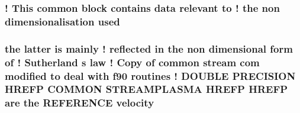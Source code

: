 \hypertarget{streamplasma_8com_ae33ecc71599b4338146f31d68e60c328}{
\subsubsection[{used}]{\setlength{\rightskip}{0pt plus 5cm}! This common block contains data relevant to ! the non {\bf dimensionalisation} used}}\label{streamplasma_8com_ae33ecc71599b4338146f31d68e60c328}
\hypertarget{streamplasma_8com_ae080af58e7f7b09ff8bedbf44df489cc}{
\subsubsection[{velocity}]{\setlength{\rightskip}{0pt plus 5cm}the latter is mainly ! reflected in the non dimensional form of ! Sutherland s law ! Copy of common stream com modified to deal with f90 routines ! D\-O\-U\-B\-L\-E P\-R\-E\-C\-I\-S\-I\-O\-N H\-R\-E\-F\-P C\-O\-M\-M\-O\-N S\-T\-R\-E\-A\-M\-P\-L\-A\-S\-M\-A H\-R\-E\-F\-P H\-R\-E\-F\-P {\bf are} the R\-E\-F\-E\-R\-E\-N\-C\-E velocity}}\label{streamplasma_8com_ae080af58e7f7b09ff8bedbf44df489cc}

